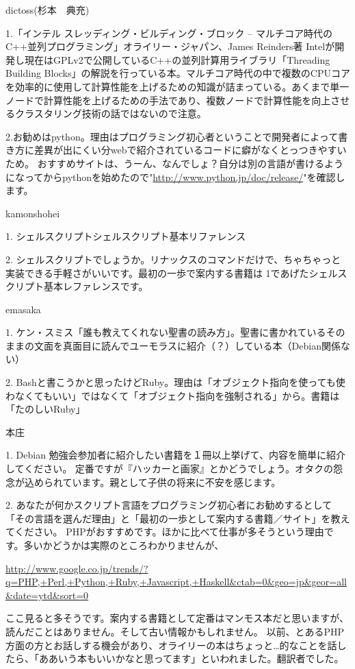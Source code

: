 \begin{prework}{ dictoss(杉本　典充) }

1.「インテル スレッディング・ビルディング・ブロック -- マルチコア時代のC++並列プログラミング」オライリー・ジャパン、James Reinders著
Intelが開発し現在はGPLv2で公開しているC++の並列計算用ライブラリ「Threading Building Blocks」の解説を行っている本。マルチコア時代の中で複数のCPUコアを効率的に使用して計算性能を上げるための知識が詰まっている。あくまで単一ノードで計算性能を上げるための手法であり、複数ノードで計算性能を向上させるクラスタリング技術の話ではないので注意。

2.お勧めはpython。理由はプログラミング初心者ということで開発者によって書き方に差異が出にくい分webで紹介されているコードに癖がなくとっつきやすいため。
おすすめサイトは、うーん、なんでしょ？自分は別の言語が書けるようになってからpythonを始めたので"\url{http://www.python.jp/doc/release/}"を確認します。
\end{prework}

\begin{prework}{ kamonshohei }

1. シェルスクリプトシェルスクリプト基本リファレンス

2. シェルスクリプトでしょうか。リナックスのコマンドだけで、ちゃちゃっと実装できる手軽さがいいです。最初の一歩で案内する書籍は 1であげたシェルスクリプト基本レファレンスです。
\end{prework}

\begin{prework}{ emasaka }

1. ケン・スミス「誰も教えてくれない聖書の読み方」。聖書に書かれているそのままの文面を真面目に読んでユーモラスに紹介（？）している本（Debian関係ない）

2. Bashと書こうかと思ったけどRuby。理由は「オブジェクト指向を使っても使わなくてもいい」ではなくて「オブジェクト指向を強制される」から。書籍は「たのしいRuby」

\end{prework}

\begin{prework}{ 本庄 }

1. Debian 勉強会参加者に紹介したい書籍を１冊以上挙げて、内容を簡単に紹介してください。
定番ですが『ハッカーと画家』とかどうでしょう。オタクの怨念が込められています。親として子供の将来に不安を感じます。

2. あなたが何かスクリプト言語をプログラミング初心者にお勧めするとして「その言語を選んだ理由」と「最初の一歩として案内する書籍／サイト」を教えてください。
PHPがおすすめです。ほかに比べて仕事が多そうという理由です。多いかどうかは実際のところわかりませんが、

\url{http://www.google.co.jp/trends/?q=PHP,+Perl,+Python,+Ruby,+Javascript,+Haskell&ctab=0&geo=jp&geor=all&date=ytd&sort=0}

ここ見ると多そうです。案内する書籍として定番はマンモス本だと思いますが、読んだことはありません。そして古い情報かもしれません。
以前、とあるPHP方面の方とお話しする機会があり、オライリーの本はちょっと…的なことを話したら、「ああいう本もいいかなと思ってます」といわれました。翻訳者でした。

\end{prework}

